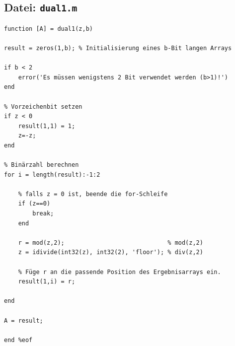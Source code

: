 \documentclass{llncs}
\begin{document}
\subsection*{Datei: \texttt{dual1.m}}
\begin{verbatim}
function [A] = dual1(z,b)

result = zeros(1,b); % Initialisierung eines b-Bit langen Arrays

if b < 2
    error('Es müssen wenigstens 2 Bit verwendet werden (b>1)!')
end

% Vorzeichenbit setzen
if z < 0
    result(1,1) = 1;
    z=-z;
end

% Binärzahl berechnen
for i = length(result):-1:2

    % falls z = 0 ist, beende die for-Schleife
    if (z==0)
        break;
    end
    
    r = mod(z,2);                             % mod(z,2)
    z = idivide(int32(z), int32(2), 'floor'); % div(z,2)
    
    % Füge r an die passende Position des Ergebnisarrays ein.
    result(1,i) = r; 
 
end

A = result;

end %eof
\end{verbatim}
\newpage
\end{document}
